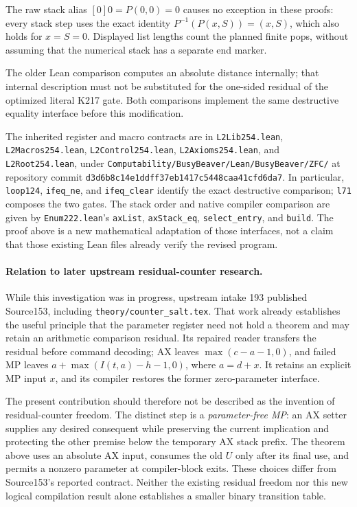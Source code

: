 The raw stack alias $[0]0=P(0,0)=0$ causes no exception in these proofs:
every stack step uses the exact identity $P^{-1}(P(x,S))=(x,S)$, which
also holds for $x=S=0$.  Displayed list lengths count the planned finite
pops, without assuming that the numerical stack has a separate end marker.

The older Lean comparison computes an absolute distance internally; that
internal description must not be substituted for the one-sided residual
of the optimized literal K217 gate.  Both comparisons implement the same
destructive equality interface before this modification.

The inherited register and macro contracts are in
\nolinkurl{L2Lib254.lean}, \nolinkurl{L2Macros254.lean},
\nolinkurl{L2Control254.lean}, \nolinkurl{L2Axioms254.lean}, and
\nolinkurl{L2Root254.lean}, under
\nolinkurl{Computability/BusyBeaver/Lean/BusyBeaver/ZFC/} at repository commit
\nolinkurl{d3d6b8c14e1ddff37eb1417c5448caa41cfd6da7}.
In particular, \nolinkurl{loop124}, \nolinkurl{ifeq_ne}, and
\nolinkurl{ifeq_clear} identify the exact destructive comparison;
\nolinkurl{l71} composes the two gates.  The stack order and native compiler
comparison are given by \nolinkurl{Enum222.lean}'s \nolinkurl{axList},
\nolinkurl{axStack_eq}, \nolinkurl{select_entry}, and \nolinkurl{build}.
The proof above is a new mathematical adaptation of those interfaces, not
a claim that those existing Lean files already verify the revised program.

\paragraph{Relation to later upstream residual-counter research.}
While this investigation was in progress, upstream intake 193 published
Source153, including \nolinkurl{theory/counter_salt.tex}.  That work already
establishes the useful principle that the parameter register need not hold
a theorem and may retain an arithmetic comparison residual.  Its repaired
reader transfers the residual before command decoding; AX leaves
$\max(c-a-1,0)$, and failed MP leaves
$a+\max(I(t,a)-h-1,0)$, where $a=d+x$.  It retains an explicit MP input
$x$, and its compiler restores the former zero-parameter interface.

The present contribution should therefore not be described as the invention
of residual-counter freedom.  The distinct step is a \emph{parameter-free
MP}: an AX setter supplies any desired consequent while preserving the
current implication and protecting the other premise below the temporary
AX stack prefix.  The theorem above uses an absolute AX input, consumes
the old $U$ only after its final use, and permits a nonzero parameter at
compiler-block exits.  These choices differ from Source153's reported
contract.  Neither the existing residual freedom nor this new logical
compilation result alone establishes a smaller binary transition table.

